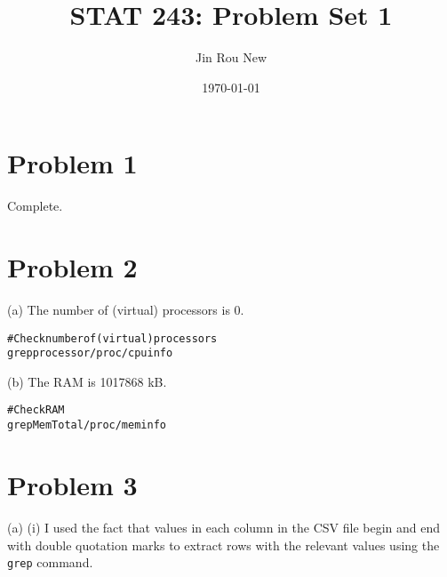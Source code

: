 \documentclass{article}\usepackage[]{graphicx}\usepackage[]{color}
\title{STAT 243: Problem Set 1}
\author{Jin Rou New}
\date{\today}
\makeatletter
\newenvironment{kframe}{%
 \def\at@end@of@kframe{}%
 \ifinner\ifhmode%
  \def\at@end@of@kframe{\end{minipage}}%
  \begin{minipage}{\columnwidth}%
 \fi\fi%
 \def\FrameCommand##1{\hskip\@totalleftmargin \hskip-\fboxsep
 \colorbox{shadecolor}{##1}\hskip-\fboxsep
     \hskip-\linewidth \hskip-\@totalleftmargin \hskip\columnwidth}%
 \MakeFramed {\advance\hsize-\width
   \@totalleftmargin\z@ \linewidth\hsize
   \@setminipage}}%
 {\par\unskip\endMakeFramed%
 \at@end@of@kframe}
\newenvironment{knitrout}{}{} %
\makeatother
\begin{document}
\maketitle

\section{Problem 1}
Complete.

\section{Problem 2}
(a)
The number of (virtual) processors is 0.
\begin{knitrout}
\color{fgcolor}\begin{kframe}
\begin{alltt}
 # Check number of (virtual) processors
 grep processor /proc/cpuinfo
\end{alltt}
\end{kframe}
\end{knitrout}

(b)
The RAM is 1017868 kB.

\begin{knitrout}
\color{fgcolor}\begin{kframe}
\begin{alltt}
 # Check RAM
 grep MemTotal /proc/meminfo
\end{alltt}
\end{kframe}
\end{knitrout}
\section{Problem 3}
(a) (i) I used the fact that values in each column in the CSV file begin and end with double quotation marks to  extract rows with the relevant values using the \texttt{grep} command.
\end{document}
